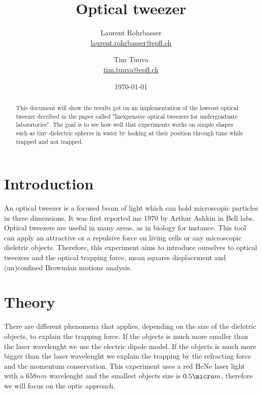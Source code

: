 \documentclass[a4paper,12pt,twoside]{article}	%
\newcommand{\mail}[1]{{\href{mailto:#1}{#1}}}
\begin{document}
\title{Optical tweezer}
\date{\today}
\author{
	Laurent Rohrbasser\\{\small \mail{laurent.rohrbasser@epfl.ch}} \and 
	Tim Tuuva\\{\small \mail{tim.tuuva@epfl.ch}}
	}
\maketitle

\tableofcontents %

\baselineskip=16pt
\parindent=15pt
\parskip=5pt

\begin{abstract}

This document will show the results got on an implementation of the lowcost optical tweezer decribed in the paper called "Inexpensive optical tweezers for undergraduate laboratories". The goal is to see how well that experiments works on simple shapes such as tiny dielectric spheres in water by looking at their position through time while trapped and not trapped.

\end{abstract}

\section{Introduction}
An optical tweezer is a focused beam of light which can hold microscopic particles in three dimensions. It was first reported ine 1970 by Arthur Ashkin in Bell labs. Optical tweezers are useful in many areas, as in biology for instance. This tool can apply an attractive or a repulsive force on living cells or any microscopic dieletric objects. Therefore, this experiment aims to introduce ourselves to optical tweezers and the optical trapping force, mean squares displacement and (un)confined Browmian motions analysis.


\section{Theory}
There are different phenomena that applies, depending on the size of the dieletric objects, to explain the trapping force.
If the objects is much more smaller than the laser wavelenght we use the electric dipole model.
If the objects is much more bigger than the laser wavelenght we explain the trapping by the refracting force and the momentum conservation.
This experiment uses a red HeNe laser light with a $658 nm$ wavelenght and the smallest objects size is $0.5\micro m$, %
therefore we will focus on the optic approach.
\end{document}
